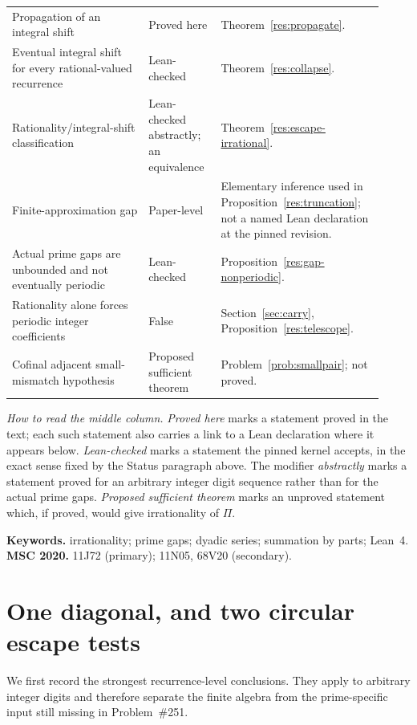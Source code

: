 \documentclass[11pt]{article}
\begin{document}
\begin{table}[!t]
\begin{tabular}{@{}
  >{\raggedright\arraybackslash}p{0.34\linewidth}
  >{\raggedright\arraybackslash}p{0.18\linewidth}
  >{\raggedright\arraybackslash}p{0.40\linewidth}@{}}
Propagation of an integral shift & Proved here & Theorem~\ref{res:propagate}. \\
Eventual integral shift for every rational-valued recurrence & Lean-checked & Theorem~\ref{res:collapse}. \\
Rationality/integral-shift classification & Lean-checked abstractly; an equivalence & Theorem~\ref{res:escape-irrational}. \\
Finite-approximation gap & Paper-level & Elementary inference used in Proposition~\ref{res:truncation}; not a named Lean declaration at the pinned revision. \\
Actual prime gaps are unbounded and not eventually periodic & Lean-checked & Proposition~\ref{res:gap-nonperiodic}. \\
Rationality alone forces periodic integer coefficients & False & Section~\ref{sec:carry}, Proposition~\ref{res:telescope}. \\
Cofinal adjacent small-mismatch hypothesis & Proposed sufficient theorem & Problem~\ref{prob:smallpair}; not proved. \\
\bottomrule
\end{tabular}

\smallskip
\begin{minipage}{0.94\linewidth}
\footnotesize
\emph{How to read the middle column.}  \emph{Proved here} marks a statement
proved in the text; each such statement also carries a link to a Lean
declaration where it appears below.
\emph{Lean-checked} marks a statement the pinned kernel accepts, in the exact
sense fixed by the Status paragraph above.  The modifier
\emph{abstractly} marks a statement proved for an arbitrary integer digit
sequence rather than for the actual prime gaps.  \emph{Proposed sufficient
theorem} marks an unproved statement
which, if proved, would give irrationality of $\Pi$.
\end{minipage}
\end{table}

\medskip
\noindent\textbf{Keywords.} irrationality; prime gaps; dyadic series;
summation by parts; Lean~4.
\qquad
\textbf{MSC 2020.} 11J72 (primary); 11N05, 68V20 (secondary).

\section{One diagonal, and two circular escape tests}\label{sec:diagonal-collapse}

We first record the strongest recurrence-level conclusions.  They apply to
arbitrary integer digits and therefore separate the finite algebra from the
prime-specific input still missing in Problem~\#251.
\end{document}

